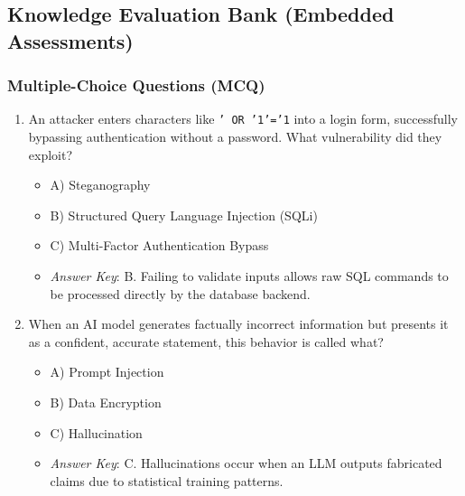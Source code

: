 \documentclass[12pt,openany]{book}
\begin{document}
\medskip

\subsection*{Knowledge Evaluation Bank (Embedded Assessments)}


\subsubsection*{Multiple-Choice Questions (MCQ)}


\begin{enumerate}

  \item An attacker enters characters like \texttt{' OR '1'='1} into a login form, successfully bypassing authentication without a password. What vulnerability did they exploit?

\begin{itemize}

  \item A) Steganography

  \item B) Structured Query Language Injection (SQLi)

  \item C) Multi-Factor Authentication Bypass

  \item \textit{Answer Key}: B. Failing to validate inputs allows raw SQL commands to be processed directly by the database backend.

\end{itemize}

  \item When an AI model generates factually incorrect information but presents it as a confident, accurate statement, this behavior is called what?

\begin{itemize}

  \item A) Prompt Injection

  \item B) Data Encryption

  \item C) Hallucination

  \item \textit{Answer Key}: C. Hallucinations occur when an LLM outputs fabricated claims due to statistical training patterns.

\end{itemize}

\end{enumerate}
\end{document}

